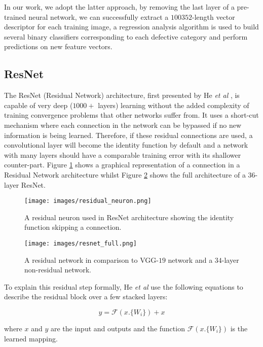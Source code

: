 \documentclass[conference]{IEEEtran}
\begin{document}
In our work, we adopt the latter approach, by removing the last layer of a pre-trained neural network, we can successfully extract a $100352$-length vector descriptor for each training image, a regression analysis algorithm is used to build several binary classifiers corresponding to each defective category and perform predictions on new feature vectors.

\subsection{ResNet}
\label{sec:resnet}

The ResNet (Residual Network) architecture, first presented by He {\it et al} \cite{He}, is capable of very deep ($1000+$ layers) learning without the added complexity of training convergence problems that other networks suffer from. It uses a short-cut mechanism where each connection in the network can be bypassed if no new information is being learned. Therefore, if these residual connections are used, a convolutional layer will become the identity function by default and a network with many layers should have a comparable training error with its shallower counter-part. Figure \ref{fig:residual} shows a graphical representation of a connection in a Residual Network architecture whilst Figure \ref{fig:resnet_full} shows the full architecture of a $36$-layer ResNet.


\begin{figure}[ht]
	\centering
	\texttt{[image: images/residual\_neuron.png]}
	\caption{A residual neuron used in ResNet architecture showing the identity function skipping a connection.}
	\label{fig:residual}
\end{figure}

\begin{figure}[ht]
	\centering
	\texttt{[image: images/resnet\_full.png]}
	\caption{A residual network in comparison to VGG-$19$ network and a $34$-layer non-residual network.}
	\label{fig:resnet_full}
\end{figure}


To explain this residual step formally, He {\it et al} \cite{He} use the following equations to describe the residual block over a few stacked layers:

\begin{equation}
    y = \mathcal{F}(x.\{W_i\}) + x
\end{equation}

where $x$ and $y$ are the input and outputs and the function $\mathcal{F}(x.\{W_i\})$ is the learned mapping. 
\end{document}
